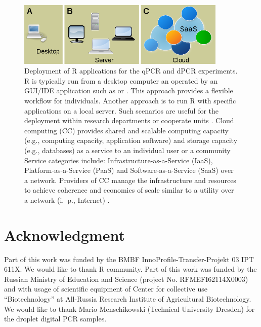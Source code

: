 \begin{figure}[htbp]
  \centering
  \includegraphics[clip=true, width=10cm]{figures/options.png}
  \caption{Deployment of R applications for the qPCR and dPCR experiments. 
 R is typically run from a desktop computer an operated by an 
GUI/IDE application such as  or . This approach 
provides a flexible workflow for individuals.  Another approach is 
to run R with specific applications on a local server. Such scenarios are useful 
for the deployment within research departments or cooperate units \citep{R_web}. 
 Cloud computing (CC) provides shared and scalable computing 
capacity (e.g., computing capacity, application software) and storage capacity 
(e.g., databases) as a service to an individual user or a community Service 
categories include: Infrastructure-as-a-Service (IaaS), Platform-as-a-Service 
(PaaS) and Software-as-a-Service (SaaS) over a network. Providers of CC manage 
the infrastructure and resources to achieve coherence and economies of scale 
similar to a utility over a network (i.~p., Internet) \citep{R_cloud}.}
  \label{figure:options}
\end{figure} 

\section{Acknowledgment}

Part of this work was funded by the BMBF InnoProfile-Transfer-Projekt 03 IPT 
611X. We would like to thank R community. Part of this work was funded by the 
Russian Ministry of Education and Science (project No. RFMEFI62114X0003) and 
with usage of scientific equipment of Center for collective use 
``Biotechnology'' at All-Russia Research Institute of Agricultural 
Biotechnology. We would like to thank Mario Menschikowski (Technical University 
Dresden) for the droplet digital PCR samples.



\address{Stefan R\"odiger (corresponding author)\\
  Faculty of Natural Sciences\\
  Brandenburg University of Technology Cottbus--Senftenberg\\
  Senftenberg\\
  Germany}

